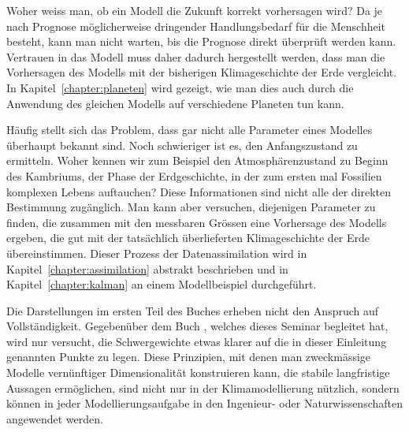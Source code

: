 Woher weiss man, ob ein Modell die Zukunft korrekt vorhersagen wird?
Da je nach Prognose möglicherweise dringender Handlungsbedarf für die
Menschheit besteht, kann man nicht warten, bis die
Prognose direkt überprüft werden kann.
Vertrauen in das Modell muss daher dadurch hergestellt werden, dass
man die Vorhersagen des Modells mit der bisherigen Klimageschichte
der Erde vergleicht.
In Kapitel~\ref{chapter:planeten} wird gezeigt, wie man dies auch
durch die Anwendung des gleichen Modells auf verschiedene Planeten
tun kann.

Häufig stellt sich das Problem, dass gar nicht alle Parameter eines
Modelles überhaupt bekannt sind.
Noch schwieriger ist es, den Anfangszustand zu ermitteln.
Woher kennen wir zum Beispiel den Atmosphärenzustand zu Beginn des
Kambriums, der Phase der Erdgeschichte, in der zum ersten mal Fossilien
komplexen Lebens auftauchen?
Diese Informationen sind nicht alle der direkten Bestimmung
zugänglich.
Man kann aber versuchen, diejenigen Parameter zu finden, die zusammen
mit den messbaren Grössen eine Vorhersage des Modells ergeben, die
gut mit der tatsächlich überlieferten Klimageschichte der Erde 
übereinstimmen.
Dieser Prozess der Datenassimilation wird in
Kapitel~\ref{chapter:assimilation} abstrakt beschrieben und in
Kapitel~\ref{chapter:kalman} an einem Modellbeispiel durchgeführt.

Die Darstellungen im ersten Teil des Buches erheben nicht den Anspruch
auf Vollständigkeit.
Gegebenüber dem Buch \cite{skript:kaperengler}, welches dieses Seminar
begleitet hat, wird nur versucht, die Schwergewichte etwas klarer auf
die in dieser Einleitung genannten Punkte zu legen.
Diese Prinzipien, mit denen man zweckmässige Modelle vernünftiger
Dimensionalität konstruieren kann, die stabile langfristige
Aussagen ermöglichen, sind nicht nur in der Klimamodellierung
nützlich, sondern können in jeder Modellierungsaufgabe in den Ingenieur-
oder Naturwissenschaften angewendet werden.








